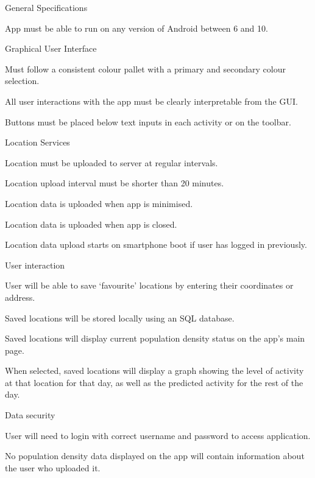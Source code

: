 \begin{SA}
    \item General Specifications
    \begin{SA}
        \item App must be able to run on any version of Android between 6 and 10.
    \end{SA}
    \item Graphical User Interface
    \begin{SA}
        \item Must follow a consistent colour pallet with a primary and secondary colour selection.
        \item All user interactions with the app must be clearly interpretable from the GUI.
        \item Buttons must be placed below text inputs in each activity or on the toolbar.
    \end{SA}
    \item Location Services
    \begin{SA}
        \item Location must be uploaded to server at regular intervals.
        \item Location upload interval must be shorter than 20 minutes.
        \item Location data is uploaded when app is minimised.
        \item Location data is uploaded when app is closed.
        \item Location data upload starts on smartphone boot if user has logged in previously.   
    \end{SA}
    \item User interaction
    \begin{SA}
        \item User will be able to save `favourite' locations by entering their coordinates or address.
        \item Saved locations will be stored locally using an SQL database.
        \item Saved locations will display current population density status on the app's main page.
        \item When selected, saved locations will display a graph showing the level of activity at that location for that day, as well as the predicted activity for the rest of the day.
    \end{SA}
    \item Data security
    \begin{SA}
        \item User will need to login with correct username and password to access application.
        \item No population density data displayed on the app will contain information about the user who uploaded it.
    \end{SA}
\end{SA}

